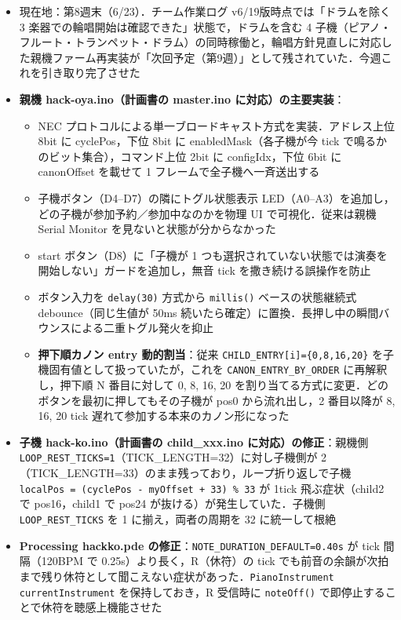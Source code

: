 \documentclass[a4paper,11pt]{ltjsarticle}
\providecommand{\％}{\%}
\begin{document}
\begin{itemize}
    \item 現在地：第8週末（6/23）．チーム作業ログ v6/19版時点では「ドラムを除く 3 楽器での輪唱開始は確認できた」状態で，ドラムを含む 4 子機（ピアノ・フルート・トランペット・ドラム）の同時稼働と，輪唱方針見直しに対応した親機ファーム再実装が「次回予定（第9週）」として残されていた．今週これを引き取り完了させた
    \item \textbf{親機 hack-oya.ino（計画書の master.ino に対応）の主要実装}：
    \begin{itemize}
        \item NEC プロトコルによる単一ブロードキャスト方式を実装．アドレス上位 8bit に cyclePos，下位 8bit に enabledMask（各子機が今 tick で鳴るかのビット集合），コマンド上位 2bit に configIdx，下位 6bit に canonOffset を載せて 1 フレームで全子機へ一斉送出する
        \item 子機ボタン（D4--D7）の隣にトグル状態表示 LED（A0--A3）を追加し，どの子機が参加予約／参加中なのかを物理 UI で可視化．従来は親機 Serial Monitor を見ないと状態が分からなかった
        \item start ボタン（D8）に「子機が 1 つも選択されていない状態では演奏を開始しない」ガードを追加し，無音 tick を撒き続ける誤操作を防止
        \item ボタン入力を \texttt{delay(30)} 方式から \texttt{millis()} ベースの状態継続式 debounce（同じ生値が 50ms 続いたら確定）に置換．長押し中の瞬間バウンスによる二重トグル発火を抑止
        \item \textbf{押下順カノン entry 動的割当}：従来 \texttt{CHILD\_ENTRY[i]=\{0,8,16,20\}} を子機固有値として扱っていたが，これを \texttt{CANON\_ENTRY\_BY\_ORDER} に再解釈し，押下順 N 番目に対して 0, 8, 16, 20 を割り当てる方式に変更．どのボタンを最初に押してもその子機が pos0 から流れ出し，2 番目以降が 8, 16, 20 tick 遅れて参加する本来のカノン形になった
    \end{itemize}
    \item \textbf{子機 hack-ko.ino（計画書の child\_xxx.ino に対応）の修正}：親機側 \texttt{LOOP\_REST\_TICKS=1}（TICK\_LENGTH=32）に対し子機側が 2（TICK\_LENGTH=33）のまま残っており，ループ折り返しで子機 \texttt{localPos = (cyclePos - myOffset + 33) \% 33} が 1tick 飛ぶ症状（child2 で pos16，child1 で pos24 が抜ける）が発生していた．子機側 \texttt{LOOP\_REST\_TICKS} を 1 に揃え，両者の周期を 32 に統一して根絶
    \item \textbf{Processing hackko.pde の修正}：\texttt{NOTE\_DURATION\_DEFAULT=0.40s} が tick 間隔（120BPM で 0.25s）より長く，R（休符）の tick でも前音の余韻が次拍まで残り休符として聞こえない症状があった．\texttt{PianoInstrument currentInstrument} を保持しておき，R 受信時に \texttt{noteOff()} で即停止することで休符を聴感上機能させた

\end{itemize}
\end{document}

